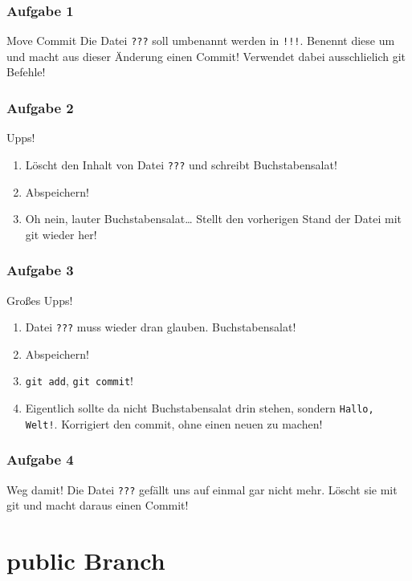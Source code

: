 \documentclass{beamer}
\begin{document}
\begin{frame}
	\frametitle{Aufgabe 1}
	\begin{block}{Move Commit}
		Die Datei \texttt{???} soll umbenannt werden in \texttt{!!!}.
		Benennt diese um und macht aus dieser Änderung einen Commit!
		Verwendet dabei ausschlielich git Befehle!
	\end{block}
\end{frame}

\begin{frame}
	\frametitle{Aufgabe 2}
	\begin{block}{Upps!}
		\begin{enumerate}
			\item Löscht den Inhalt von Datei \texttt{???} und schreibt Buchstabensalat!
			\pause
			\item Abspeichern!
			\pause
			\item Oh nein, lauter Buchstabensalat… Stellt den vorherigen Stand der Datei mit git wieder her!
		\end{enumerate}
	\end{block}
\end{frame}

\begin{frame}
	\frametitle{Aufgabe 3}
	\begin{block}{Großes Upps!}
		\begin{enumerate}
			\item Datei \texttt{???} muss wieder dran glauben. Buchstabensalat!
			\pause
			\item Abspeichern!
			\pause
			\item \texttt{git add}, \texttt{git commit}!
			\pause
			\item Eigentlich sollte da nicht Buchstabensalat drin stehen, sondern \texttt{Hallo, Welt!}.
		Korrigiert den commit, ohne einen neuen zu machen!
		\end{enumerate}
	\end{block}
\end{frame}

\begin{frame}
	\frametitle{Aufgabe 4}
	\begin{block}{Weg damit!}
		Die Datei \texttt{???} gefällt uns auf einmal gar nicht mehr.
		Löscht sie mit git und macht daraus einen Commit!
	\end{block}
\end{frame}

\section{public Branch}
\end{document}
